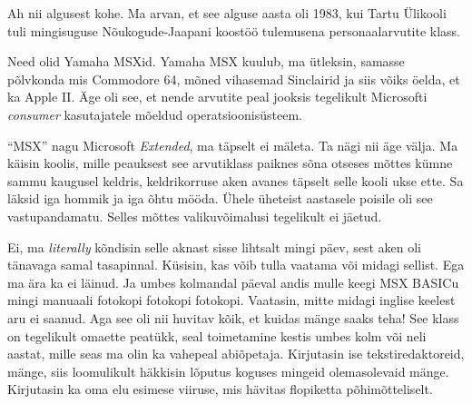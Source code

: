 
Ah nii algusest kohe. Ma arvan, et see alguse aasta oli 1983, kui  Tartu 
Ülikooli tuli mingisuguse Nõukogude-Jaapani koostöö 
tulemusena personaalarvutite klass.


Need olid Yamaha MSXid. Yamaha MSX kuulub, ma 
ütleksin, samasse põlvkonda mis Commodore 64, mõned vihasemad Sinclairid ja 
siis võiks öelda, et ka Apple II. Äge oli see, et  nende arvutite peal jooksis 
tegelikult Microsofti  \emph{consumer} kasutajatele mõeldud operatsioonisüsteem.


\enquote{MSX} nagu Microsoft \emph{Extended}, ma täpselt ei mäleta. Ta nägi nii äge välja. Ma käisin koolis, mille peauksest see 
arvutiklass paiknes sõna otseses mõttes kümne sammu kaugusel  
keldris, keldrikorruse aken avanes täpselt selle kooli ukse ette. Sa läksid 
iga hommik ja iga õhtu mööda. Ühele üheteist aastasele 
poisile oli see vastupandamatu. Selles mõttes    valikuvõimalusi tegelikult  
ei jäetud. 


Ei, ma \emph{literally} kõndisin selle aknast sisse lihtsalt mingi päev, sest 
aken oli tänavaga samal tasapinnal. Küsisin, kas võib tulla vaatama või midagi 
sellist. Ega ma ära ka ei läinud. Ja  umbes kolmandal päeval 
andis mulle keegi MSX BASICu 
mingi  manuaali fotokopi fotokopi fotokopi. Vaatasin, mitte midagi 
inglise keelest aru ei saanud. Aga see oli nii huvitav kõik, et kuidas mänge saaks 
teha! See klass on tegelikult omaette peatükk, seal toimetamine kestis  
umbes kolm või neli aastat, mille seas ma olin ka vahepeal abiõpetaja. 
 Kirjutasin ise tekstiredaktoreid, mänge, siis loomulikult häkkisin 
lõputus koguses mingeid olemasolevaid mänge. Kirjutasin ka oma elu esimese 
viiruse, mis hävitas flopiketta põhimõtteliselt. 


